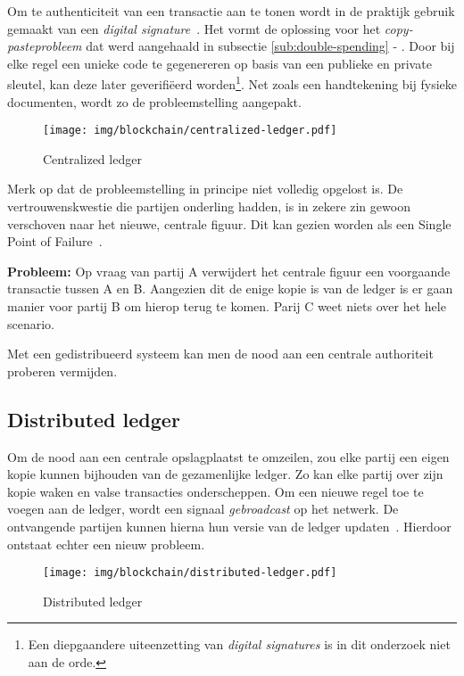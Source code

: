Om te authenticiteit van een transactie aan te tonen wordt in de praktijk gebruik gemaakt van een \textit{digital signature}~\autocite{Salem2008}. Het vormt de oplossing voor het \textit{copy-pasteprobleem} dat werd aangehaald in subsectie \ref{sub:double-spending} - . Door bij elke regel een unieke code te gegenereren op basis van een publieke en private sleutel, kan deze later geverifiëerd worden\footnote{Een diepgaandere uiteenzetting van \textit{digital signatures} is in dit onderzoek niet aan de orde.}. Net zoals een handtekening bij fysieke documenten, wordt zo de probleemstelling aangepakt.

\begin{figure}[H]
	\centering
	\texttt{[image: img/blockchain/centralized-ledger.pdf]}
	\caption{\label{fig:centralized-ledger}Centralized ledger}
\end{figure}

Merk op dat de probleemstelling in principe niet volledig opgelost is. De vertrouwenskwestie die partijen onderling hadden, is in zekere zin gewoon verschoven naar het nieuwe, centrale figuur. Dit kan gezien worden als een Single Point of Failure~\autocite{Majaski2021}.

\textbf{Probleem:} 
Op vraag van partij A verwijdert het centrale figuur een voorgaande transactie tussen A en B. 
Aangezien dit de enige kopie is van de ledger is er gaan manier voor partij B om hierop terug te komen. Parij C weet niets over het hele scenario.

Met een gedistribueerd systeem kan men de nood aan een centrale authoriteit proberen vermijden.


\subsection{Distributed ledger}
\label{sub:distributed-ledger}

Om de nood aan een centrale opslagplaatst te omzeilen, zou elke partij een eigen kopie kunnen bijhouden van de gezamenlijke ledger. Zo kan elke partij over zijn kopie waken en valse transacties onderscheppen. Om een nieuwe regel toe te voegen aan de ledger, wordt een signaal \textit{gebroadcast} op het netwerk. De ontvangende partijen kunnen hierna hun versie van de ledger updaten~\autocite{Nakamoto2008}. Hierdoor ontstaat echter een nieuw probleem.

\begin{figure}[H]
	\centering
	\texttt{[image: img/blockchain/distributed-ledger.pdf]}
	\caption{\label{fig:distributed-ledger}Distributed ledger}
\end{figure}

